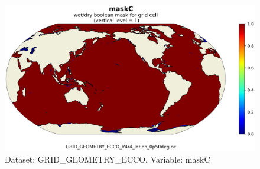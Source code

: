 \begin{figure}[H]
\centering
\includegraphics[scale=0.55]{../images/v4r4/plots/latlon_plots_coords/Geometry_Parameters_for_the_0.5_degree_Lat-Lon_Model_Grid_(Version_4_Release_4)/maskC.png}
\caption{Dataset: GRID\_GEOMETRY\_ECCO, Variable: maskC}
\label{tab:table-GRID_GEOMETRY_ECCO_maskC-Plot}
\end{figure}
\newpage